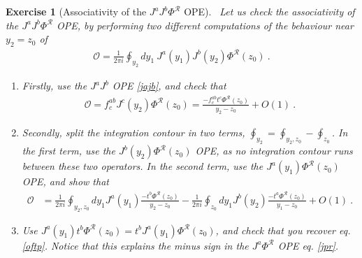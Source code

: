 \documentclass[12pt, a4paper, notitlepage, twoside]{report}
\numberwithin{equation}{section}
\theoremstyle{break}
\newtheorem{exo}{Exercise}[chapter]
\begin{document}
\begin{exo}[Associativity of the $J^aJ^b\Phi^\mathcal{R}$ OPE]
 ~\label{exojjp}
Let us check the associativity of the $J^aJ^b\Phi^\mathcal{R}$ OPE, by performing two different computations of the behaviour near $y_2=z_0$ of 
\begin{align}
\mathcal{O}= \frac{1}{2\pi i} \oint_{y_2}dy_1\ J^a(y_1)J^b(y_2)\Phi^\mathcal{R}(z_0)\ .
\end{align}
\begin{enumerate}
 \item 
Firstly, use the $J^aJ^b$ OPE \eqref{jajb}, and check that
\begin{align}
 \mathcal{O}= f_c^{ab}J^c(y_2)\Phi^\mathcal{R}(z_0) = \frac{-f_c^{ab}t^c\Phi^\mathcal{R}(z_0)}{y_2-z_0} + O(1)\ .
 \label{oftp}
\end{align}

\item
Secondly, split the integration contour in two terms, $\oint_{y_2} = \oint_{y_2,z_0} - \oint_{z_0}$.
In the first term, use the $J^b(y_2)\Phi^\mathcal{R}(z_0)$ OPE, as no integration contour runs between these two operators.
In the second term, use the $J^a(y_1)\Phi^\mathcal{R}(z_0)$ OPE, and show that
\begin{align}
 \mathcal{O}& =\frac{1}{2\pi i} \oint_{y_2,z_0}dy_1 J^a(y_1)\frac{-t^b\Phi^\mathcal{R}(z_0)}{y_2-z_0} - \frac{1}{2\pi i} \oint_{z_0}dy_1 J^b(y_2)\frac{-t^a\Phi^\mathcal{R}(z_0)}{y_1-z_0} +O(1)\ .
\end{align}

\item
Use $J^a(y_1) t^b \Phi^\mathcal{R}(z_0) =t^b J^a(y_1)  \Phi^\mathcal{R}(z_0)$, and check that you recover eq. \eqref{oftp}.
Notice that this explains the minus sign in the $J^a\Phi^\mathcal{R}$ OPE eq. \eqref{jpr}.
\end{enumerate}
\end{exo}
\end{document}
